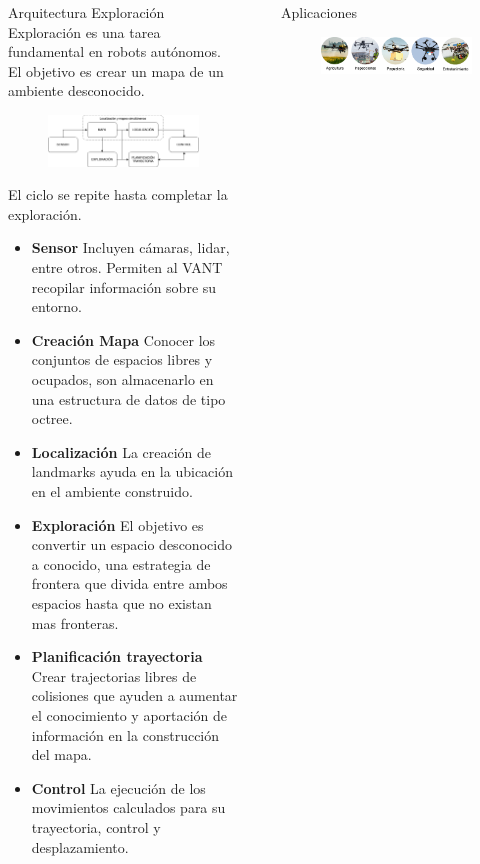 \documentclass[final]{beamer}
\newlength{\sepwidth}
\newlength{\colwidth}
\newcommand{\separatorcolumn}{\begin{column}{\sepwidth}\end{column}}
\begin{document}
\begin{frame}[t]
\begin{columns}[t]
\begin{column}{\colwidth}
  \begin{block}{\color{teal}Arquitectura Exploración}
    Exploración es una tarea fundamental en robots autónomos. El objetivo es crear un mapa de un ambiente desconocido. \cite{C2022}
    \begin{figure}[t]
      \centering
      \includegraphics[width=30cm]{images/exploracion.png}
    \end{figure}
    El ciclo se repite hasta completar la exploración.
    \begin{itemize}
    \item \textbf{Sensor} Incluyen cámaras, lidar, entre otros. Permiten al VANT recopilar información sobre su entorno.
    \item \textbf{Creación Mapa} Conocer los conjuntos de espacios libres y ocupados, son almacenarlo en una estructura de datos de tipo octree.
    \item \textbf{Localización} La creación de landmarks ayuda en la ubicación en el ambiente construido.
    \item \textbf{Exploración} El objetivo es convertir un espacio desconocido a conocido, una estrategia de frontera que divida entre ambos espacios hasta que no existan mas fronteras.
    \item \textbf{Planificación trayectoria} Crear trajectorias libres de colisiones que ayuden a aumentar el conocimiento y aportación de información en la construcción del mapa.
    \item \textbf{Control} La ejecución de los movimientos calculados para su trayectoria, control y desplazamiento.
    \end{itemize}
  \end{block}
\end{column}

\separatorcolumn

\begin{column}{\colwidth}
  
  \begin{block}{\color{teal}Aplicaciones}

    \begin{figure}
      \centering
      \includegraphics[width=30cm]{images/ap_dr.png}
      \end{figure}
  \end{block}


\end{column}
\end{columns}
\end{frame}
\end{document}
